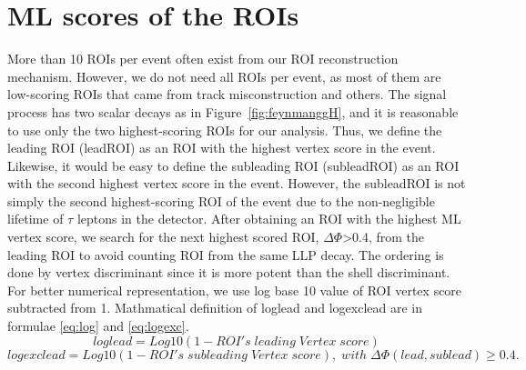 \section{ML scores of the ROIs}
More than 10 ROIs per event often exist from our ROI reconstruction mechanism.
However, we do not need all ROIs per event, as most of them are low-scoring ROIs that came from track misconstruction and others.
The signal process has two scalar decays as in Figure~\ref{fig:feynmanggH}, and it is reasonable to use only the two highest-scoring ROIs for our analysis.
Thus, we define the leading ROI (leadROI) as an ROI with the highest vertex score in the event.
Likewise, it would be easy to define the subleading ROI (subleadROI) as an ROI with the second highest vertex score in the event.
However, the subleadROI is not simply the second highest-scoring ROI of the event due to the non-negligible lifetime of $\tau$ leptons in the detector.
After obtaining an ROI with the highest ML vertex score, we search for the next highest scored ROI, $\Delta\Phi$>0.4, from the leading ROI to avoid counting ROI from the same LLP decay.
The ordering is done by vertex discriminant since it is more potent than the shell discriminant.
For better numerical representation, we use log base 10 value of ROI vertex score subtracted from 1.
Mathmatical definition of loglead and logexclead are in formulae \ref{eq:log} and \ref{eq:logexc}. 
\begin{equation}
\label{eq:log}
	loglead = Log10(1-ROI's\;leading\;Vertex\;score)
\end{equation}
\begin{equation}
\label{eq:logexc}
	logexclead = Log10(1-ROI's\;subleading\;Vertex\;score),\;with\;\Delta\Phi(lead,sublead) \geq 0.4.
\end{equation}

%

